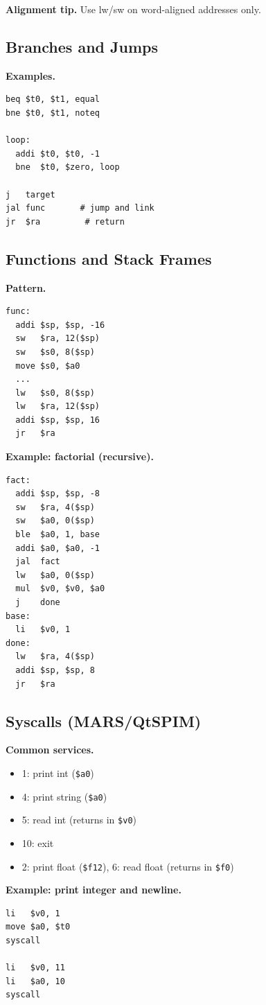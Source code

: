 \documentclass[11pt]{article}
\begin{document}
\textbf{Alignment tip.} Use lw/sw on word-aligned addresses only.

\subsection{Branches and Jumps}
\textbf{Examples.}
\begin{verbatim}
beq $t0, $t1, equal
bne $t0, $t1, noteq

loop:
  addi $t0, $t0, -1
  bne  $t0, $zero, loop

j   target
jal func       # jump and link
jr  $ra         # return
\end{verbatim}

\subsection{Functions and Stack Frames}
\textbf{Pattern.}
\begin{verbatim}
func:
  addi $sp, $sp, -16
  sw   $ra, 12($sp)
  sw   $s0, 8($sp)
  move $s0, $a0
  ...
  lw   $s0, 8($sp)
  lw   $ra, 12($sp)
  addi $sp, $sp, 16
  jr   $ra
\end{verbatim}

\textbf{Example: factorial (recursive).}
\begin{verbatim}
fact:
  addi $sp, $sp, -8
  sw   $ra, 4($sp)
  sw   $a0, 0($sp)
  ble  $a0, 1, base
  addi $a0, $a0, -1
  jal  fact
  lw   $a0, 0($sp)
  mul  $v0, $v0, $a0
  j    done
base:
  li   $v0, 1
done:
  lw   $ra, 4($sp)
  addi $sp, $sp, 8
  jr   $ra
\end{verbatim}

\subsection{Syscalls (MARS/QtSPIM)}
\textbf{Common services.}
\begin{itemize}[leftmargin=*]
  \item 1: print int (\texttt{\$a0})
  \item 4: print string (\texttt{\$a0})
  \item 5: read int (returns in \texttt{\$v0})
  \item 10: exit
  \item 2: print float (\texttt{\$f12}), 6: read float (returns in \texttt{\$f0})
\end{itemize}

\textbf{Example: print integer and newline.}
\begin{verbatim}
li   $v0, 1
move $a0, $t0
syscall

li   $v0, 11
li   $a0, 10
syscall
\end{verbatim}
\end{document}

